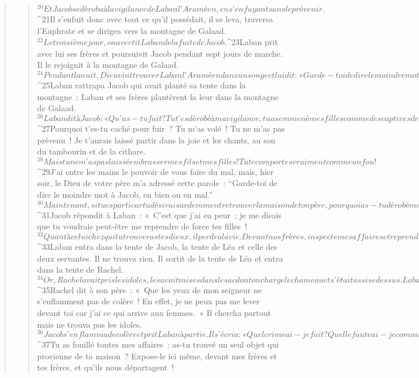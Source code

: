 \begin{verse}
\begin{verse}
${}^{20}Et Jacob se déroba à la vigilance de Laban l’Araméen, en s’enfuyant sans le prévenir. 
${}^{21}Il s’enfuit donc avec tout ce qu’il possédait, il se leva, traversa l’Euphrate et se dirigea vers la montagne de Galaad.
${}^{22}Le troisième jour, on avertit Laban de la fuite de Jacob. 
${}^{23}Laban prit avec lui ses frères et poursuivit Jacob pendant sept jours de marche. Il le rejoignit à la montagne de Galaad. 
${}^{24}Pendant la nuit, Dieu vint trouver Laban l’Araméen dans un songe et lui dit : « Garde-toi de dire le moindre mot à Jacob, en bien ou en mal. »
${}^{25}Laban rattrapa Jacob qui avait planté sa tente dans la montagne ; Laban et ses frères plantèrent la leur dans la montagne de Galaad. 
${}^{26}Laban dit à Jacob : « Qu’as-tu fait ? Tu t’es dérobé à ma vigilance, tu as emmené mes filles comme des captives de guerre ! 
${}^{27}Pourquoi t’es-tu caché pour fuir ? Tu m’as volé ! Tu ne m’as pas prévenu ! Je t’aurais laissé partir dans la joie et les chants, au son du tambourin et de la cithare. 
${}^{28}Mais tu ne m’as pas laissé embrasser mes fils et mes filles ! Tu te comportes vraiment comme un fou ! 
${}^{29}J’ai entre les mains le pouvoir de vous faire du mal, mais, hier soir, le Dieu de votre père m’a adressé cette parole : “Garde-toi de dire le moindre mot à Jacob, en bien ou en mal.” 
${}^{30}Maintenant, si tu es parti car tu désirais ardemment retrouver la maison de ton père, pourquoi as-tu dérobé mes dieux ? »
${}^{31}Jacob répondit à Laban : « C’est que j’ai eu peur ; je me disais que tu voudrais peut-être me reprendre de force tes filles ! 
${}^{32}Quant à celui chez qui tu trouveras tes dieux, il perdra la vie. Devant nos frères, inspecte mes affaires et reprends ce qui est à toi. » Jacob, en effet, ne savait pas que Rachel avait dérobé les idoles domestiques. 
${}^{33}Laban entra dans la tente de Jacob, la tente de Léa et celle des deux servantes. Il ne trouva rien. Il sortit de la tente de Léa et entra dans la tente de Rachel. 
${}^{34}Or, Rachel avait pris les idoles, les avait mises dans le sac dont on charge le chameau et s’était assise dessus. Laban fouilla toute la tente mais il ne trouva rien. 
${}^{35}Rachel dit à son père : « Que les yeux de mon seigneur ne s’enflamment pas de colère ! En effet, je ne peux pas me lever devant toi car j’ai ce qui arrive aux femmes. » Il chercha partout mais ne trouva pas les idoles.
${}^{36}Jacob s’enflamma de colère et prit Laban à partie. Il s’écria : « Quel crime ai-je fait ? Quelle faute ai-je commise pour que tu t’acharnes contre moi ? 
${}^{37}Tu as fouillé toutes mes affaires : as-tu trouvé un seul objet qui provienne de ta maison ? Expose-le ici même, devant mes frères et tes frères, et qu’ils nous départagent ! 

\end{verse}
\end{verse}
